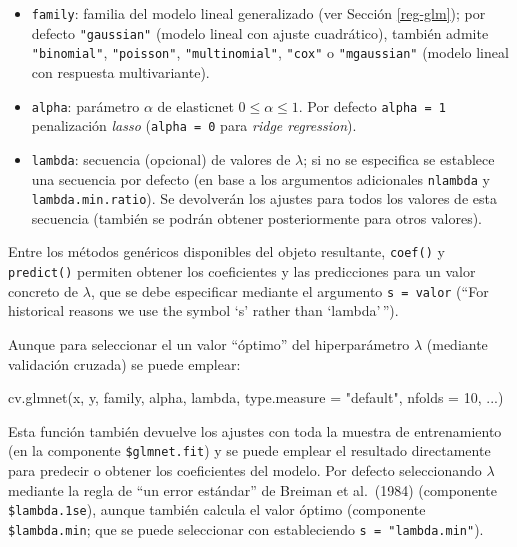 \documentclass[
]{book}
\newenvironment{Shaded}{\begin{snugshade}}{\end{snugshade}}
\newcommand{\AttributeTok}[1]{\textcolor[rgb]{0.77,0.63,0.00}{#1}}
\newcommand{\DecValTok}[1]{\textcolor[rgb]{0.00,0.00,0.81}{#1}}
\newcommand{\FunctionTok}[1]{\textcolor[rgb]{0.00,0.00,0.00}{#1}}
\newcommand{\NormalTok}[1]{#1}
\newcommand{\StringTok}[1]{\textcolor[rgb]{0.31,0.60,0.02}{#1}}
\theoremstyle{break}
\theoremstyle{definition}
\theoremstyle{definition}
\theoremstyle{definition}
\theoremstyle{definition}
\theoremstyle{remark}
\begin{document}
\begin{itemize}
\item
  \texttt{family}: familia del modelo lineal generalizado (ver Sección \ref{reg-glm}); por defecto \texttt{"gaussian"} (modelo lineal con ajuste cuadrático), también admite \texttt{"binomial"}, \texttt{"poisson"}, \texttt{"multinomial"}, \texttt{"cox"} o \texttt{"mgaussian"} (modelo lineal con respuesta multivariante).
\item
  \texttt{alpha}: parámetro \(\alpha\) de elasticnet \(0 \leq \alpha \leq 1\). Por defecto \texttt{alpha\ =\ 1} penalización \emph{lasso} (\texttt{alpha\ =\ 0} para \emph{ridge regression}).
\item
  \texttt{lambda}: secuencia (opcional) de valores de \(\lambda\); si no se especifica se establece una secuencia por defecto (en base a los argumentos adicionales \texttt{nlambda} y \texttt{lambda.min.ratio}). Se devolverán los ajustes para todos los valores de esta secuencia (también se podrán obtener posteriormente para otros valores).
\end{itemize}

Entre los métodos genéricos disponibles del objeto resultante, \texttt{coef()} y \texttt{predict()} permiten obtener los coeficientes y las predicciones para un valor concreto de \(\lambda\), que se debe especificar mediante el argumento \texttt{s\ =\ valor} (``For historical reasons we use the symbol `s' rather than `lambda'\,'').

Aunque para seleccionar el un valor ``óptimo'' del hiperparámetro \(\lambda\) (mediante validación cruzada) se puede emplear:

\begin{Shaded}
\begin{Highlighting}[]
\FunctionTok{cv.glmnet}\NormalTok{(x, y, family, alpha, lambda, }\AttributeTok{type.measure =} \StringTok{"default"}\NormalTok{, }\AttributeTok{nfolds =} \DecValTok{10}\NormalTok{, ...)}
\end{Highlighting}
\end{Shaded}

Esta función también devuelve los ajustes con toda la muestra de entrenamiento (en la componente \texttt{\$glmnet.fit}) y se puede emplear el resultado directamente para predecir o obtener los coeficientes del modelo.
Por defecto seleccionando \(\lambda\) mediante la regla de ``un error estándar'' de Breiman et al.~(1984) (componente \texttt{\$lambda.1se}), aunque también calcula el valor óptimo (componente \texttt{\$lambda.min}; que se puede seleccionar con estableciendo \texttt{s\ =\ "lambda.min"}).
\end{document}
